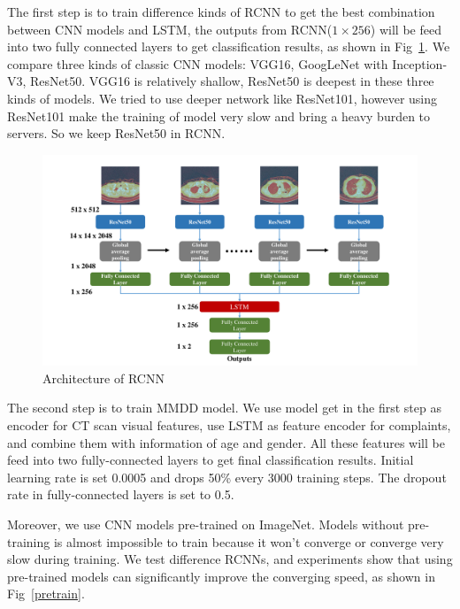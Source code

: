 \documentclass[runningheads]{llncs}
\begin{document}
The first step is to train difference kinds of RCNN to get the best combination between CNN models and LSTM, the outputs from RCNN($1 \times 256$) will be feed into two fully connected layers to get classification results, as shown in Fig~\ref{onestream}. We compare three kinds of classic CNN models: VGG16, GoogLeNet with Inception-V3, ResNet50. VGG16 is relatively shallow, ResNet50 is deepest in these three kinds of models. We tried to use deeper network like ResNet101, however using ResNet101 make the training of model very slow and bring a heavy burden to servers. So we keep ResNet50 in RCNN.
\begin{figure}[t]
    \centerline{\includegraphics[width=130mm]{onestream.pdf}}
    \vspace{-0cm}
    \caption{Architecture of RCNN}
    \vspace{-0cm}
    \label{onestream}
    \end{figure}

The second step is to train MMDD model. We use model get in the first step as encoder for CT scan visual features, use LSTM as feature encoder for complaints, and combine them with information of age and gender. All these features will be feed into two fully-connected layers to get final classification results. Initial learning rate is set 0.0005 and drops 50\% every 3000 training steps. The dropout rate in fully-connected layers is set to 0.5.


Moreover, we use CNN models pre-trained on ImageNet\cite{ILSVRC15}. Models without pre-training is almost impossible to train because it won't converge or converge very slow during training. We test difference RCNNs, and experiments show that using pre-trained models can significantly improve the converging speed, as shown in Fig~\ref{pretrain}.
\end{document}
